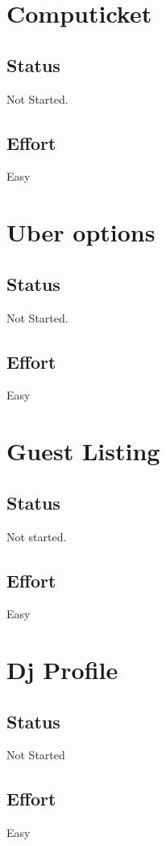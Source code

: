 \documentclass[10pt,a4paper]{article}
\begin{document}
\section{Computicket}

\subsection{Status}
Not Started.

\subsection{Effort}
Easy

\section{Uber options}

\subsection{Status}
Not Started.

\subsection{Effort}
Easy

\section{Guest Listing}

\subsection{Status}
Not started.

\subsection{Effort}
Easy

\section{Dj Profile}

\subsection{Status}
Not Started

\subsection{Effort}
Easy
\end{document}

